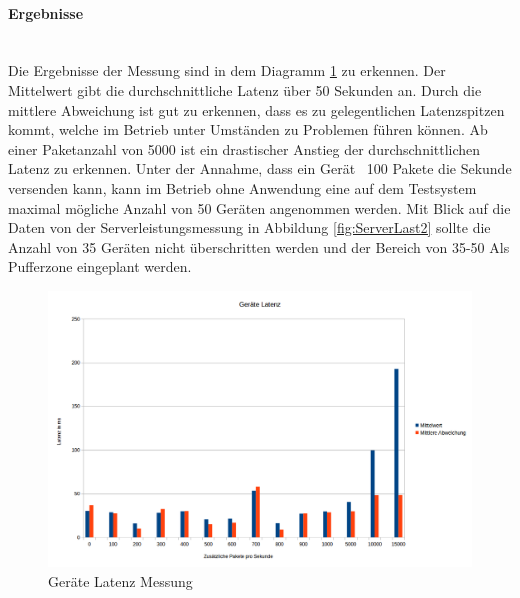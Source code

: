 \documentclass[a4paper]{spie}  %
\begin{document}
\begin{minipage}[t]{0.4\textwidth}
\vspace{0pt}

\paragraph{Ergebnisse}\mbox{}\\
Die Ergebnisse der Messung sind in dem Diagramm \ref{fig:LatenzMessung} zu erkennen. Der Mittelwert gibt die durchschnittliche Latenz über 50 Sekunden an. Durch die mittlere Abweichung ist gut zu erkennen, dass es zu gelegentlichen Latenzspitzen kommt, welche im Betrieb unter Umständen zu Problemen führen können. Ab einer Paketanzahl von 5000 ist ein drastischer Anstieg der durchschnittlichen Latenz zu erkennen. Unter der Annahme, dass ein Gerät ~100 Pakete die Sekunde versenden kann, kann im Betrieb ohne Anwendung eine auf dem Testsystem maximal mögliche Anzahl von 50 Geräten angenommen werden. Mit Blick auf die Daten von der Serverleistungsmessung in Abbildung \ref{fig:ServerLast2} sollte die Anzahl von 35 Geräten nicht überschritten werden und der Bereich von 35-50 Als Pufferzone eingeplant werden.

\end{minipage}
\hfill
\begin{minipage}[t]{0.5\textwidth}
	\begin{figure}[H]
	\vspace{0pt}
		\centering
		\centering
		\includegraphics[width=1\textwidth]{./images/LatenzMessung.png}
		\caption{Geräte Latenz Messung}
		\label{fig:LatenzMessung}
	\end{figure}	
\end{minipage}
\end{document}
